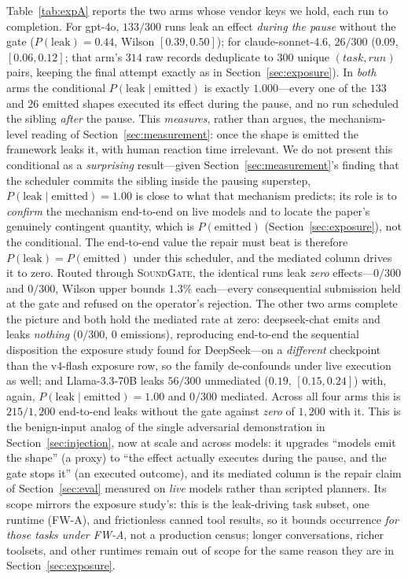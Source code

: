 \documentclass[10pt,journal,compsoc]{IEEEtran}
\newcommand{\sys}{\textsc{SoundGate}}
\begin{document}
Table~\ref{tab:expA} reports the two arms whose vendor keys we hold, each run to
completion. For \textsf{gpt-4o}, $133/300$ runs leak an effect \emph{during the
pause} without the gate ($P(\mathrm{leak}){=}0.44$, Wilson $[0.39,0.50]$); for
\textsf{claude-sonnet-4.6}, $26/300$ ($0.09$, $[0.06,0.12]$; that arm's $314$
raw records deduplicate to $300$ unique $(\mathit{task},\mathit{run})$ pairs,
keeping the final attempt exactly as in Section~\ref{sec:exposure}). In \emph{both}
arms the conditional $P(\mathrm{leak}\mid\mathrm{emitted})$ is exactly
$1.000$---every one of the $133$ and $26$ emitted shapes executed its effect
during the pause, and no run scheduled the sibling \emph{after} the pause. This
\emph{measures}, rather than argues, the mechanism-level reading of
Section~\ref{sec:measurement}: once the shape is emitted the framework leaks it,
with human reaction time irrelevant. We do not present this conditional as a
\emph{surprising} result---given Section~\ref{sec:measurement}'s finding that
the scheduler commits the sibling inside the pausing superstep, $P(\mathrm{leak}
\mid\mathrm{emitted}){=}1.00$ is close to what that mechanism predicts; its
role is to \emph{confirm} the mechanism end-to-end on live models and to
locate the paper's genuinely contingent quantity, which is
$P(\mathrm{emitted})$ (Section~\ref{sec:exposure}), not the conditional. The
end-to-end value the repair must beat is therefore $P(\mathrm{leak}){=}
P(\mathrm{emitted})$ under this scheduler, and the mediated column drives it
to zero.  Routed through \sys{}, the identical runs
leak \emph{zero} effects---$0/300$ and $0/300$, Wilson upper bounds $1.3\%$
each---every consequential submission held at the gate and refused on the
operator's rejection. The other two arms complete the picture and both hold the
mediated rate at zero: \textsf{deepseek-chat} emits and leaks \emph{nothing}
($0/300$, $0$ emissions), reproducing end-to-end the sequential disposition the
exposure study found for DeepSeek---on a \emph{different} checkpoint than the
\textsf{v4-flash} exposure row, so the family de-confounds under live execution
as well; and \textsf{Llama-3.3-70B} leaks $56/300$ unmediated ($0.19$,
$[0.15,0.24]$) with, again, $P(\mathrm{leak}\mid\mathrm{emitted}){=}1.00$ and
$0/300$ mediated. Across all four arms this is $215/1{,}200$ end-to-end leaks
without the gate against \emph{zero} of $1{,}200$ with it.
This is the benign-input analog of the single adversarial demonstration in
Section~\ref{sec:injection}, now at scale and across models: it upgrades
``models emit the shape'' (a proxy) to ``the effect actually executes during
the pause, and the gate stops it'' (an executed outcome), and its mediated
column is the repair claim of Section~\ref{sec:eval} measured on \emph{live}
models rather than scripted planners. Its scope mirrors the exposure study's:
this is the leak-driving task subset, one runtime (\textsf{FW-A}), and
frictionless canned tool results, so it bounds occurrence \emph{for those tasks
under \textsf{FW-A}}, not a production census; longer conversations, richer
toolsets, and other runtimes remain out of scope for the same reason they are
in Section~\ref{sec:exposure}.
\end{document}
